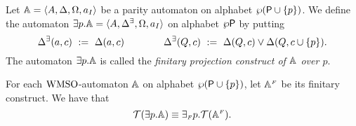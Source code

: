 
\begin{definition}\label{DEF_fin_projection}
Let $\mathbb{A} = \langle{A, \Delta, \Omega, a_I}\rangle$ be a parity automaton on alphabet $\wp(\mathsf{P} \cup \{p\})$. We define the automaton ${{\exists} p}.\mathbb{A} = \langle{A, \Delta^\exists, \Omega, a_I}\rangle$ on alphabet $\wp\mathsf{P}$ by putting
\begin{equation*}
  \Delta^\exists(a,c) \ \mathrel{: =} \ \Delta(a,c) \qquad \qquad
  \Delta^\exists(Q,c) \ \mathrel{: =} \ \Delta(Q,c) \vee \Delta(Q,c\cup\{p\}).
\end{equation*}
The automaton ${{\exists} p}.\mathbb{A}$ is called the \emph{finitary projection
construct of $\mathbb{A}$ over $p$}.
\end{definition}


\begin{lemma}\label{PROP_fin_projection} 
For each $\mathrm{WMSO}$-automaton $\mathbb{A}$ on alphabet $\wp (\mathsf{P} \cup \{p\})$, let $\mathbb{A}^{{\scriptscriptstyle F}}$ be its finitary construct. We have that
$$\mathcal{T}({{\exists} p}.\mathbb{A}) \equiv
{{\exists_{{\scriptscriptstyle F}}} p}.\mathcal{T}(\mathbb{A}^{{\scriptscriptstyle F}}).$$
\end{lemma}

